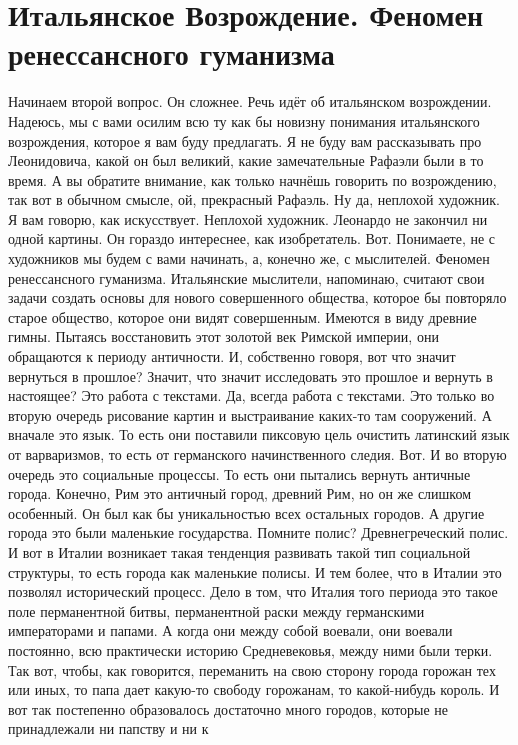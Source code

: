 \section{Итальянское Возрождение. Феномен ренессансного гуманизма}

Начинаем второй вопрос. Он сложнее. Речь идёт об
итальянском возрождении. Надеюсь, мы с вами осилим всю ту как бы новизну
понимания итальянского возрождения, которое я вам буду предлагать. Я не буду вам
рассказывать про Леонидовича, какой он был великий, какие замечательные Рафаэли
были в то время. А вы обратите внимание, как только начнёшь говорить по
возрождению, так вот в обычном смысле, ой, прекрасный Рафаэль. Ну да, неплохой
художник. Я вам говорю, как искусствует. Неплохой художник. Леонардо не закончил
ни одной картины. Он гораздо интереснее, как изобретатель. Вот. Понимаете, не с
художников мы будем с вами начинать, а, конечно же, с мыслителей. Феномен
ренессансного гуманизма. Итальянские мыслители, напоминаю, считают свои задачи
создать основы для нового совершенного общества, которое бы повторяло старое
общество, которое они видят совершенным. Имеются в виду древние гимны. Пытаясь
восстановить этот золотой век Римской империи, они обращаются к периоду
античности. И, собственно говоря, вот что значит вернуться в прошлое? Значит,
что значит исследовать это прошлое и вернуть в настоящее? Это работа с текстами.
Да, всегда работа с текстами. Это только во вторую очередь рисование картин и
выстраивание каких-то там сооружений. А вначале это язык. То есть они поставили
пиксовую цель очистить латинский язык от варваризмов, то есть от германского
начинственного следия. Вот. И во вторую очередь это социальные процессы. То есть
они пытались вернуть античные города. Конечно, Рим это античный город, древний
Рим, но он же слишком особенный. Он был как бы уникальностью всех остальных
городов. А другие города это были маленькие государства. Помните полис?
Древнегреческий полис. И вот в Италии возникает такая тенденция развивать такой
тип социальной структуры, то есть города как маленькие полисы. И тем более, что
в Италии это позволял исторический процесс. Дело в том, что Италия того периода
это такое поле перманентной битвы, перманентной раски между германскими
императорами и папами. А когда они между собой воевали, они воевали постоянно,
всю практически историю Средневековья, между ними были терки. Так вот, чтобы,
как говорится, переманить на свою сторону города горожан тех или иных, то папа
дает какую-то свободу горожанам, то какой-нибудь король. И вот так постепенно
образовалось достаточно много городов, которые не принадлежали ни папству и ни к
